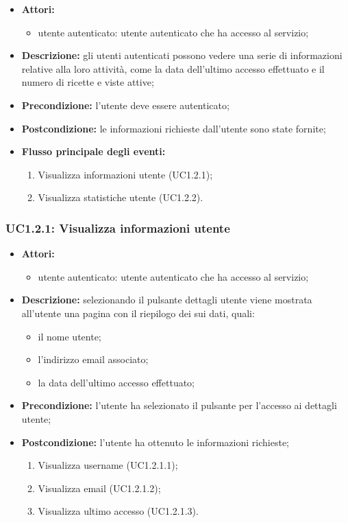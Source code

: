 \begin{itemize}
	\item \textbf{Attori:}
	\begin{itemize}
		\item utente autenticato: utente autenticato che ha accesso al servizio;
	\end{itemize}
	\item \textbf{Descrizione:} gli utenti autenticati possono vedere una serie di informazioni relative alla 	loro attività, come la data dell'ultimo accesso effettuato e il numero di ricette e viste attive;
	\item \textbf{Precondizione:} l'utente deve essere autenticato;
	\item \textbf{Postcondizione:} le informazioni richieste dall'utente sono state fornite;
	\item \textbf{Flusso principale degli eventi:}
	\begin{enumerate}
		\item Visualizza informazioni utente (UC1.2.1);
		\item Visualizza statistiche utente (UC1.2.2).
	\end{enumerate}
\end{itemize}

\subsubsection{UC1.2.1: Visualizza informazioni utente}

\begin{itemize}
	\item \textbf{Attori:}
	\begin{itemize}
		\item utente autenticato: utente autenticato che ha accesso al servizio;
	\end{itemize}
	\item \textbf{Descrizione:} selezionando il pulsante dettagli utente viene mostrata all'utente una pagina con il riepilogo dei sui dati, quali:
	\begin{itemize}
		\item il nome utente;
		\item l'indirizzo email associato;
		\item la data dell'ultimo accesso effettuato;
	\end{itemize}
	\item \textbf{Precondizione:} l'utente ha selezionato il pulsante per l'accesso ai dettagli utente;
	\item \textbf{Postcondizione:} l'utente ha ottenuto le informazioni richieste;
  \begin{enumerate}
    \item Visualizza username (UC1.2.1.1);
    \item Visualizza email (UC1.2.1.2);
    \item Visualizza ultimo accesso (UC1.2.1.3).
  \end{enumerate}
\end{itemize}

